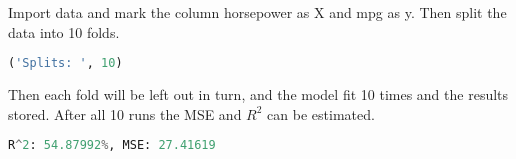 Import data and mark the column horsepower as X and mpg as y. Then split the data into 10 folds.
\begin{lstlisting}[language=Python]
('Splits: ', 10)
\end{lstlisting}

Then each fold will be left out in turn, and the model fit 10 times and the results stored. After all 10 runs the MSE and $R^2$ can be estimated.

\begin{lstlisting}[language=Python]
R^2: 54.87992%, MSE: 27.41619
\end{lstlisting}

